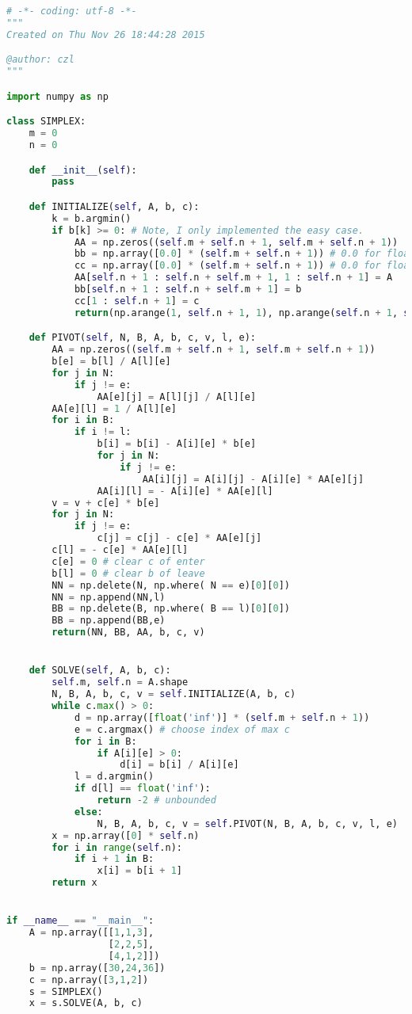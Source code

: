 \documentclass[a4paper,12pt]{article}
\begin{document}
\begin{lstlisting}[language=python]
# -*- coding: utf-8 -*-
"""
Created on Thu Nov 26 18:44:28 2015

@author: czl
"""

import numpy as np

class SIMPLEX:
    m = 0
    n = 0

    def __init__(self):
        pass

    def INITIALIZE(self, A, b, c):
        k = b.argmin()
        if b[k] >= 0: # Note, I only implemented the easy case.
            AA = np.zeros((self.m + self.n + 1, self.m + self.n + 1))
            bb = np.array([0.0] * (self.m + self.n + 1)) # 0.0 for float64
            cc = np.array([0.0] * (self.m + self.n + 1)) # 0.0 for float64
            AA[self.n + 1 : self.n + self.m + 1, 1 : self.n + 1] = A
            bb[self.n + 1 : self.n + self.m + 1] = b
            cc[1 : self.n + 1] = c
            return(np.arange(1, self.n + 1, 1), np.arange(self.n + 1, self.n + self.m + 1, 1), AA, bb, cc, 0)

    def PIVOT(self, N, B, A, b, c, v, l, e):
        AA = np.zeros((self.m + self.n + 1, self.m + self.n + 1))
        b[e] = b[l] / A[l][e]
        for j in N:
            if j != e:
                AA[e][j] = A[l][j] / A[l][e]
        AA[e][l] = 1 / A[l][e]
        for i in B:
            if i != l:
                b[i] = b[i] - A[i][e] * b[e]
                for j in N:
                    if j != e:
                        AA[i][j] = A[i][j] - A[i][e] * AA[e][j]
                AA[i][l] = - A[i][e] * AA[e][l]
        v = v + c[e] * b[e]
        for j in N:
            if j != e:
                c[j] = c[j] - c[e] * AA[e][j]
        c[l] = - c[e] * AA[e][l]
        c[e] = 0 # clear c of enter
        b[l] = 0 # clear b of leave
        NN = np.delete(N, np.where( N == e)[0][0])
        NN = np.append(NN,l)
        BB = np.delete(B, np.where( B == l)[0][0])
        BB = np.append(BB,e)
        return(NN, BB, AA, b, c, v)


    def SOLVE(self, A, b, c):
        self.m, self.n = A.shape
        N, B, A, b, c, v = self.INITIALIZE(A, b, c)
        while c.max() > 0:
            d = np.array([float('inf')] * (self.m + self.n + 1))
            e = c.argmax() # choose index of max c
            for i in B:
                if A[i][e] > 0:
                    d[i] = b[i] / A[i][e]
            l = d.argmin()
            if d[l] == float('inf'):
                return -2 # unbounded
            else:
                N, B, A, b, c, v = self.PIVOT(N, B, A, b, c, v, l, e)
        x = np.array([0] * self.n)
        for i in range(self.n):
            if i + 1 in B:
                x[i] = b[i + 1]
        return x


if __name__ == "__main__":
    A = np.array([[1,1,3],
                  [2,2,5],
                  [4,1,2]])
    b = np.array([30,24,36])
    c = np.array([3,1,2])
    s = SIMPLEX()
    x = s.SOLVE(A, b, c)

\end{lstlisting}
\end{document}
